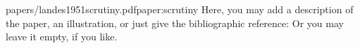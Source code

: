 
\begin{paper}{papers/landes1951scrutiny.pdf}{paper:scrutiny}
    Here, you may add a description of the paper, an illustration, or just give the bibliographic reference:
    Or you may leave it empty, if you like.
\end{paper}


